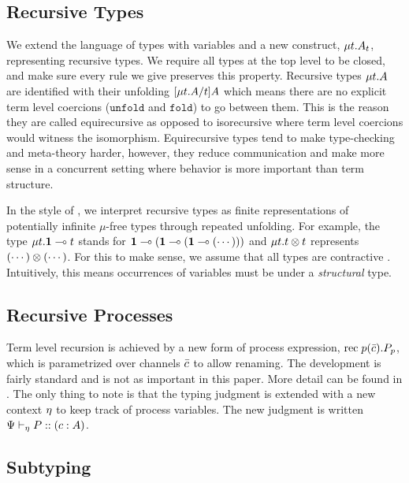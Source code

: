 \documentclass[submission,copyright,creativecommons]{eptcs}
\begin{document}
\subsection{Recursive Types}

We extend the language of types with variables and a new construct, $\mu{t} . {A_t}$, representing recursive types. We require all types at the top level to be closed, and make sure every rule we give preserves this property. Recursive types $\mu{t} . {A}$ are identified with their unfolding $\lbrack{\mu{t} . {A}}/{t}\rbrack{A}$ which means there are no explicit term level coercions ($\mathtt{unfold}$ and $\mathtt{fold}$) to go between them. This is the reason they are called equirecursive as opposed to isorecursive where term level coercions would witness the isomorphism. Equirecursive types tend to make type-checking and meta-theory harder, however, they reduce communication and make more sense in a concurrent setting where behavior is more important than term structure.

In the style of \cite{AmadioC91}, we interpret recursive types as finite representations of potentially infinite $\mu$-free types through repeated unfolding. For example, the type $\mu{t} . {\mathbf{1} \multimap t}$ stands for $\mathbf{1} \multimap (\mathbf{1} \multimap (\mathbf{1} \multimap (\cdots )))$ and $\mu{t} . {t \otimes t}$ represents $(\cdots) \otimes (\cdots)$. For this to make sense, we assume that all types are contractive \cite{Stone05un, GayH05}. Intuitively, this means occurrences of variables must be under a \emph{structural} type.


\subsection{Recursive Processes}

Term level recursion is achieved by a new form of process expression, $\mathrm{rec}\; {p}(\bar{c}) . {P}_p$, which is parametrized over channels $\bar{c}$ to allow renaming. The development is fairly standard and is not as important in this paper. More detail can be found in \cite{ToninhoCP14}. The only thing to note is that the typing judgment is extended with a new context $\eta$ to keep track of process variables. The new judgment is written ${\Psi} \vdash_{\eta} P :: (c : A)$.


\subsection{Subtyping}
\label{original-subtyping}
\end{document}

